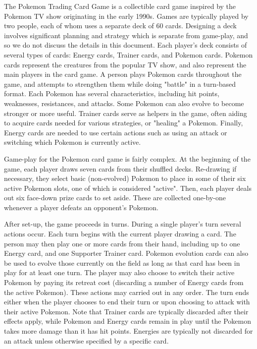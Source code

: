 \documentclass{article}
\begin{document}
The Pokemon Trading Card Game is a collectible card game inspired by the Pokemon TV show originating in the early 1990s.  Games are typically played by two people, each of whom uses a separate deck of $60$ cards.  Designing a deck involves significant planning and strategy which is separate from game-play, and so we do not discuss the details in this document.  Each player's deck consists of several types of cards: Energy cards, Trainer cards, and Pokemon cards.  Pokemon cards represent the creatures from the popular TV show, and also represent the main players in the card game.  A person plays Pokemon cards throughout the game, and attempts to strengthen them while doing "battle" in a turn-based format.  Each Pokemon has several characteristics, including hit points, weaknesses, resistances, and attacks.  Some Pokemon can also evolve to become stronger or more useful.  Trainer cards serve as helpers in the game, often aiding to acquire cards needed for various strategies, or "healing" a Pokemon.  Finally, Energy cards are needed to use certain actions such as using an attack or switching which Pokemon is currently active.

Game-play for the Pokemon card game is fairly complex.  At the beginning of the game, each player draws seven cards from their shuffled decks.  Re-drawing if necessary, they select basic (non-evolved) Pokemon to place in some of their six active Pokemon slots, one of which is considered "active". Then, each player deals out six face-down prize cards to set aside.  These are collected one-by-one whenever a player defeats an opponent's Pokemon.  

After set-up, the game proceeds in turns.  During a single player's turn several actions occur.  Each turn begins with the current player drawing a card.  The person may then play one or more cards from their hand, including up to one Energy card, and one Supporter Trainer card.  Pokemon evolution cards can also be used to evolve those currently on the field as long as that card has been in play for at least one turn.  The player may also choose to switch their active Pokemon by paying its retreat cost (discarding a number of Energy cards from the active Pokemon).  These actions may carried out in any order.  The turn ends either when the player chooses to end their turn or upon choosing to attack with their active Pokemon.  Note that Trainer cards are typically discarded after their effects apply, while Pokemon and Energy cards remain in play until the Pokemon takes more damage than it has hit points.  Energies are typically not discarded for an attack unless otherwise specified by a specific card.
\end{document}
